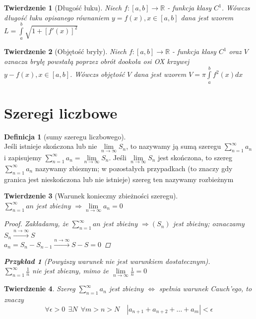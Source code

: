 \documentclass[12pt,a4paper]{article}
\newtheorem{tw}{Twierdzenie}
\newtheorem{przyklad}{Przykład}
\theoremstyle{definition}
\newtheorem{df}{Definicja}
\begin{document}
\begin{tw}[Długość łuku]
Niech $f: [a,b] \to \mathbb{R}$ - funkcja klasy $C^1$. Wówczs długość łuku opisanego równaniem $y=f(x), x\in [a,b]$ dana jest wzorem $L = \int\limits_a^b \sqrt{1 + \left[f'(x)\right]^2}$
\end{tw}

\begin{tw}[Objętość bryły]
Niech $f: [a,b] \to \mathbb{R}$ - funkcja klasy $C^1$ oraz $V$ oznacza bryłę powstałą poprzez obrót dookoła osi OX krzywej $y - f(x), x\in [a,b]$. Wówczs objętość $V$ dana jest wzorem $V = \pi\int\limits_a^b f^2(x)dx$
\end{tw}

\section{Szeregi liczbowe}

\begin{df}[sumy szeregu liczbowego]~\\
Jeśli istnieje skończona lub nie $\lim\limits_{n\to\infty}S_n$, to nazywamy ją sumą szeregu $\sum\limits_{n=1}^\infty a_n$ i zapisujemy $\sum\limits_{n=1}^\infty a_n=\lim\limits_{n\to\infty}S_n$.
Jeśli $\lim\limits_{n\to\infty}S_n$ jest skończona, to szereg $\sum\limits_{n=1}^\infty a_n$ nazywamy zbieznym; w pozostałych przypadkach (to znaczy gdy granica jest nieskończona lub nie istnieje) szereg ten nazywamy rozbieżnym
\end{df}

\begin{tw}[Warunek konieczny zbieżności szeregu]~\\
$\sum\limits_{n=1}^\infty an$ jest zbieżny $\Rightarrow \lim\limits_{n\to\infty}a_n = 0$
\begin{proof}
Zakładamy, że $\sum\limits_{n=1}^\infty an$ jest zbieżny $\Rightarrow (S_n)$ jest zbieżny; oznaczamy 
$S_n \xrightarrow{n\to\infty} S$\\
$a_n = S_n - S_{n-1} \xrightarrow{n\to\infty} S - S = 0$ 
\end{proof}
\begin{przyklad}[Powyższy warunek nie jest warunkiem dostatecznym]~\\
$\sum\limits_{n=1}^\infty \frac{1}{n}$ nie jest zbiezny, mimo że $\lim\limits_{n\to\infty} \frac{1}{n} = 0$
\end{przyklad}
\end{tw}

\begin{tw}
Szereg $\sum\limits_{n=1}^\infty a_n$ jest zbieżny $\Leftrightarrow$ spełnia warunek Cauch'ego, to znaczy
$$
\forall \epsilon > 0 ~~\exists N ~~\forall m > n > N \quad |a_{n+1} + a_{n+2} + \dots + a_m| < \epsilon
$$
\end{tw}
\end{document}
